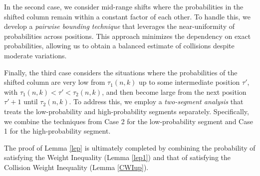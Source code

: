 \documentclass[11pt]{article}
\begin{document}
In the second case, we consider mid-range shifts where the probabilities in the shifted column remain 
within a constant factor of each other. 
To handle this, we develop a \textit{pairwise bounding technique} that leverages the near-uniformity 
of probabilities across positions. This approach minimizes the dependency on exact probabilities, 
allowing us to obtain a balanced estimate of collisions despite moderate variations. 

Finally, the third case considers the situations where the probabilities of the 
shifted column are very low from $\tau_1(n,k)$ up to some intermediate position $\tau'$, with
$\tau_1(n,k) < \tau' < \tau_2(n,k)$, and then become large from the next position $\tau' +1$ until 
$\tau_2(n,k)$. 
To address this, we employ a \textit{two-segment analysis} that treats the low-probability 
and high-probability segments separately. Specifically, we combine the techniques from Case 2 
for the low-probability segment and Case 1 for the high-probability segment.



\iffalse
The second case addresses mid-range shifts, where the probabilities in the shifted column remain within a 
constant factor of each other. Finally, the third case considers situations where the probabilities of the 
shifted column are very low from $\tau_1(n,k)$ up to some intermediate position $\tau'$, with
$\tau_1(n,k) < \tau' < \tau_2(n,k)$, and then become large from the next position $\tau' +1$ until 
$\tau_2(n,k)$.
\dk{???WHERE WE USE REARANGEMENT INEQUALITY???}
\fi

The proof of Lemma \ref{lep} is ultimately completed by combining the probability of satisfying the Weight Inequality (Lemma \ref{lep1}) and that of satisfying the Collision Weight Inequality (Lemma \ref{CWIup}).
\end{document}
